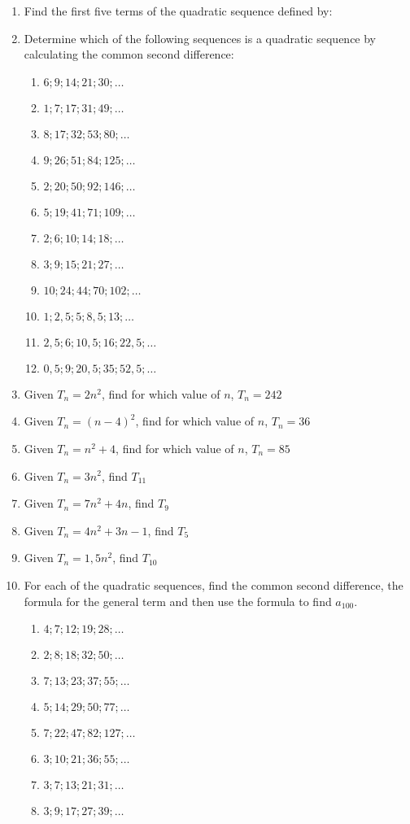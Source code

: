 \begin{eocexercises}{}
\begin{enumerate}
\item{Find the first five terms of the quadratic sequence defined by:
}
\item{Determine which of the following sequences is a quadratic sequence by calculating the common second difference:
\begin{enumerate}
\item $6; 9; 14; 21; 30;\ldots$
\item $1; 7; 17; 31; 49;\ldots$
\item $8; 17; 32; 53; 80;\ldots$
\item $9; 26; 51; 84; 125;\ldots$
\item $2; 20; 50; 92; 146;\ldots$
\item $5; 19; 41; 71; 109;\ldots$
\item $2; 6; 10; 14; 18;\ldots$
\item $3; 9; 15; 21; 27;\ldots$
\item $10; 24; 44; 70; 102;\ldots$
\item $1; 2,5; 5; 8,5; 13;\ldots$
\item $2,5; 6; 10,5; 16; 22,5;\ldots$
\item $0,5; 9; 20,5; 35; 52,5;\ldots$
\end{enumerate}}
\item{Given $T_n= 2n^2$, find for which value of $n$, $T_n=242$}
\item{Given $T_n= (n - 4)^2$, find for which value of $n$, $T_n=36$}
\item{Given $T_n= n^2+4$, find for which value of $n$, $T_n=85$}
\item{Given $T_n= 3n^2$, find $T_{11}$}
\item{Given $T_n= 7n^2+4n$, find $T_{9}$}
\item{Given $T_n= 4n^2+3n-1$, find $T_{5}$}
\item{Given $T_n= 1,5n^2$, find $T_{10}$}
\item{For each of the quadratic sequences, find the common second difference, the formula for the general term and then use the formula to find $a_{100}$.
\begin{enumerate}
\item $4;7;12;19;28;\ldots$
\item $2;8;18;32;50;\ldots$
\item $7;13;23;37;55;\ldots$
\item $5;14;29;50;77;\ldots$
\item $7;22;47;82;127;\ldots$
\item $3;10;21;36;55;\ldots$
\item $3;7;13;21;31;\ldots$
\item $3;9;17;27;39;\ldots$
\end{enumerate}}

\end{enumerate}



\practiceinfo
\end{eocexercises} 




